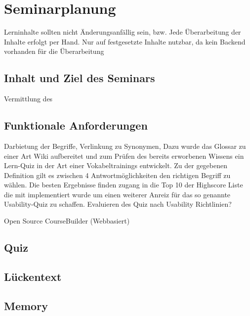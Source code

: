 \documentclass[a4paper, 12pt, twoside, BCOR=20mm, DIV=calc, abstracton, parskip=half*, toc=bibliography, toc=listof, headsepline, footsepline, headings=small, numbers=enddot]{scrreprt}
\begin{document}
	\section{Seminarplanung}
Lerninhalte sollten nicht Änderungsanfällig sein, bzw. Jede Überarbeitung der Inhalte erfolgt per Hand. Nur auf festgesetzte Inhalte nutzbar, da kein Backend vorhanden für die Überarbeitung

	\subsection{Inhalt und Ziel des Seminars}
	Vermittlung des
	\subsection{Funktionale Anforderungen}
	Darbietung der Begriffe, Verlinkung zu Synonymen, 
	Dazu wurde das Glossar zu einer Art Wiki aufbereitet und zum Prüfen des bereits erworbenen Wissens ein Lern-Quiz in der Art einer Vokabeltrainings entwickelt. Zu der gegebenen Definition gilt es zwischen 4 Antwortmöglichkeiten den richtigen Begriff zu wählen. Die besten Ergebnisse finden zugang in die Top 10 der Highscore Liste die mit implementiert wurde um einen weiterer Anreiz für das so genannte Usability-Quiz zu schaffen. 
	Evaluieren des Quiz nach Usability Richtlinien?
	
	Open Source
	CourseBuilder (Webbasiert) 
	
	\subsection{Quiz}
	\subsection{Lückentext}
	\subsection{Memory}
	
\end{document}
